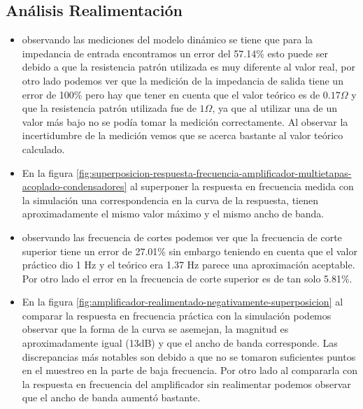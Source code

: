 \subsection{Análisis Realimentación}


\begin{itemize}
    \item observando las mediciones del modelo dinámico se tiene que para la impedancia de entrada encontramos un error del 57.14\% esto puede ser debido a que la resistencia patrón utilizada es muy diferente al valor real, por otro lado podemos ver que la medición de la impedancia de salida tiene un error de 100\% pero hay que tener en cuenta que el valor teórico es de $0.17 \Omega$ y que la resistencia patrón utilizada fue de $1 \Omega$, ya que al utilizar una de un valor más bajo no se podía tomar la medición correctamente. Al observar la incertidumbre de la medición vemos que se acerca bastante al valor teórico calculado.
    \item En la figura \ref{fig:superposicion-respuesta-frecuencia-amplificador-multietapas-acoplado-condensadores} al superponer la respuesta en frecuencia medida con la simulación una correspondencia en la curva de la respuesta, tienen aproximadamente el mismo valor máximo y el mismo ancho de banda.
    \item observando las frecuencia de cortes podemos ver que la frecuencia de corte superior tiene un error de 27.01\% sin embargo teniendo en cuenta que el valor práctico dio 1 Hz y el teórico era 1.37 Hz parece una aproximación aceptable. Por otro lado el error en la frecuencia de corte superior es de tan solo 5.81\%.
    \item En la figura \ref{fig:amplificador-realimentado-negativamente-superposicion} al comparar la respuesta en frecuencia práctica con la simulación podemos observar que la forma de la curva se asemejan, la magnitud es aproximadamente igual (13dB) y que el ancho de banda corresponde. Las discrepancias más notables son debido a que no se tomaron suficientes puntos en el muestreo en la parte de baja frecuencia. Por otro lado al compararla con la respuesta en frecuencia del amplificador sin realimentar podemos observar que el ancho de banda aumentó bastante. 
\end{itemize}
